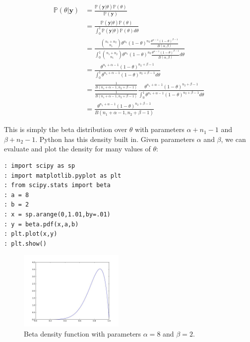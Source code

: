 \begin{align*}
\mathbb{P}(\theta | \mathbf{y}) & = \frac{\mathbb{P}(\mathbf{y} | \theta)\mathbb{P}(\theta)}{\mathbb{P}(\mathbf{y})} \\
& = \frac{\mathbb{P}(\mathbf{y} | \theta)\mathbb{P}(\theta)}{\int_{0}^{1} \mathbb{P}(\mathbf{y} | \theta)\mathbb{P}(\theta) d\theta} \\
& = \frac{{n_{1} + n_{2} \choose n_{1}} \theta^{n_{1}}(1-\theta)^{n_{2}} \frac{\theta^{\alpha - 1}(1 - \theta)^{\beta - 1}}{B(\alpha,\beta)}}{\int_{0}^{1} {n_{1} + n_{2} \choose n_{1}} \theta^{n_{1}}(1-\theta)^{n_{2}} \frac{\theta^{\alpha - 1}(1 - \theta)^{\beta - 1}}{B(\alpha,\beta)} d\theta} \\
& = \frac{ \theta^{n_{1} + \alpha - 1}(1-\theta)^{n_{2} + \beta - 1}}{\int_{0}^{1} \theta^{n_{1} + \alpha - 1}(1-\theta)^{n_{2} + \beta - 1} d\theta} \\
& = \frac{\frac{1}{B(n_{1} + \alpha - 1, n_{2} + \beta - 1)}}{\frac{1}{B(n_{1} + \alpha - 1, n_{2} + \beta - 1)}} \frac{ \theta^{n_{1} + \alpha - 1}(1-\theta)^{n_{2} + \beta - 1}}{\int_{0}^{1} \theta^{n_{1} + \alpha - 1}(1-\theta)^{n_{2} + \beta - 1} d\theta} \\
& = \frac{ \theta^{n_{1} + \alpha - 1}(1-\theta)^{n_{2} + \beta - 1}}{B(n_{1} + \alpha - 1, n_{2} + \beta - 1)}
\end{align*}

This is simply the beta distribution over $\theta$ with parameters $\alpha + n_{1} - 1$ and $\beta + n_{2} - 1$. Python has this density built in. Given parameters $\alpha$ and $\beta$, we can evaluate and plot the density for many values of $\theta$:

\begin{lstlisting}[style=python]
: import scipy as sp
: import matplotlib.pyplot as plt
: from scipy.stats import beta
: a = 8
: b = 2
: x = sp.arange(0,1.01,by=.01)
: y = beta.pdf(x,a,b)
: plt.plot(x,y)
: plt.show()
\end{lstlisting}

\begin{figure}[h]
\begin{center}
\includegraphics[height=1.5in]{beta.jpeg}
\end{center}
\caption{Beta density function with parameters $\alpha = 8$ and $\beta = 2$.}
\end{figure}

